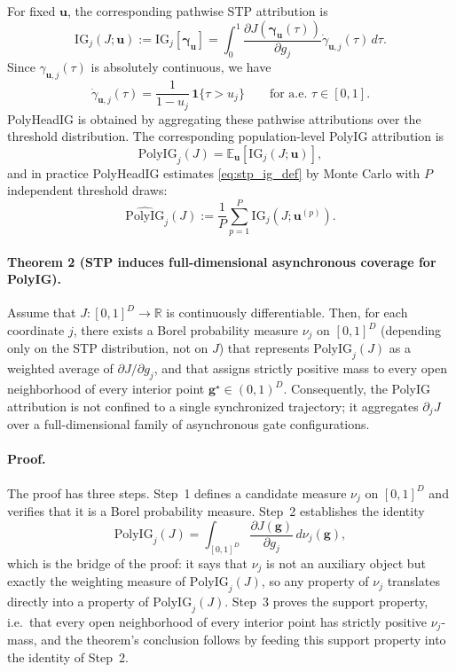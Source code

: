 For fixed $\mathbf{u}$, the corresponding pathwise STP attribution is
\begin{equation}
\mathrm{IG}_j(J;\mathbf{u})
:=
\mathrm{IG}_j[\boldsymbol{\gamma}_{\mathbf{u}}]
=
\int_0^1
\frac{\partial J(\boldsymbol{\gamma}_{\mathbf{u}}(\tau))}{\partial g_j}
\dot{\gamma}_{\mathbf{u},j}(\tau)\,d\tau.
\label{eq:stp_ig_theory}
\end{equation}
Since $\gamma_{\mathbf{u},j}(\tau)$ is absolutely continuous, we have
\begin{equation}
\dot{\gamma}_{\mathbf{u},j}(\tau)=\frac{1}{1-u_j}\,\mathbf{1}\{\tau>u_j\}
\qquad \text{for a.e. }\tau\in[0,1].
\label{eq:stp_derivative}
\end{equation}
PolyHeadIG is obtained by aggregating these pathwise attributions over the threshold distribution. The corresponding population-level PolyIG attribution is
\begin{equation}
\mathrm{PolyIG}_j(J)
=
\mathbb{E}_{\mathbf{u}}\!\left[ \mathrm{IG}_j(J;\mathbf{u}) \right],
\label{eq:stp_ig_def}
\end{equation}
and in practice PolyHeadIG estimates \eqref{eq:stp_ig_def} by Monte Carlo with $P$ independent threshold draws:
\begin{equation}
\widehat{\mathrm{PolyIG}}_j(J)
:=
\frac{1}{P}\sum_{p=1}^{P}\mathrm{IG}_j(J;\mathbf{u}^{(p)}).
\label{eq:stp_mc_estimator}
\end{equation}

\paragraph{Theorem 2 (STP induces full-dimensional asynchronous coverage for PolyIG).}
Assume that $J:[0,1]^D\to\mathbb{R}$ is continuously differentiable. Then, for each coordinate $j$, there exists a Borel probability measure $\nu_j$ on $[0,1]^D$ (depending only on the STP distribution, not on $J$) that represents $\mathrm{PolyIG}_j(J)$ as a weighted average of $\partial J/\partial g_j$, and that assigns strictly positive mass to every open neighborhood of every interior point $\mathbf{g}^{\star}\in(0,1)^D$. Consequently, the PolyIG attribution is not confined to a single synchronized trajectory; it aggregates $\partial_j J$ over a full-dimensional family of asynchronous gate configurations.

\paragraph{Proof.}
The proof has three steps. Step~1 defines a candidate measure $\nu_j$ on $[0,1]^D$ and verifies that it is a Borel probability measure. Step~2 establishes the identity
\[
\mathrm{PolyIG}_j(J)
=
\int_{[0,1]^D}\frac{\partial J(\mathbf{g})}{\partial g_j}\,d\nu_j(\mathbf{g}),
\]
which is the bridge of the proof: it says that $\nu_j$ is not an auxiliary object but exactly the weighting measure of $\mathrm{PolyIG}_j(J)$, so any property of $\nu_j$ translates directly into a property of $\mathrm{PolyIG}_j(J)$. Step~3 proves the support property, i.e.\ that every open neighborhood of every interior point has strictly positive $\nu_j$-mass, and the theorem's conclusion follows by feeding this support property into the identity of Step~2.

